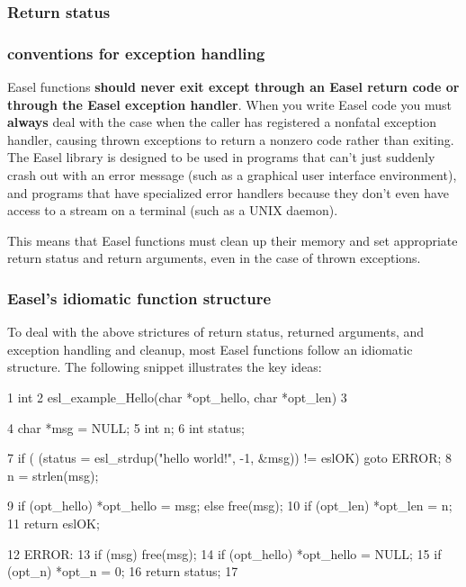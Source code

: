 \subsubsection{Return status}

\subsubsection{conventions for exception handling}

Easel functions {\bfseries should never exit except through an Easel
  return code or through the Easel exception handler}. When you write
Easel code you must {\bfseries always} deal with the case when the
caller has registered a nonfatal exception handler, causing thrown
exceptions to return a nonzero code rather than exiting. The Easel
library is designed to be used in programs that can't just suddenly
crash out with an error message (such as a graphical user interface
environment), and programs that have specialized error handlers
because they don't even have access to a  stream on a
terminal (such as a UNIX daemon).

This means that Easel functions must clean up their memory and set
appropriate return status and return arguments, even in the case of
thrown exceptions.


\subsubsection{Easel's idiomatic function structure}

To deal with the above strictures of return status, returned
arguments, and exception handling and cleanup, most Easel functions
follow an idiomatic structure.  The following snippet illustrates the
key ideas:

\begin{cchunk}
1    int
2    esl_example_Hello(char *opt_hello, char *opt_len)
3    {
4      char *msg = NULL;
5      int   n;
6      int   status;

7      if ( (status = esl_strdup("hello world!\n", -1, &msg)) != eslOK) goto ERROR;
8      n = strlen(msg);

9      if (opt_hello) *opt_hello = msg; else free(msg);
10     if (opt_len)   *opt_len   = n;
11     return eslOK;

12  ERROR:
13     if (msg)        free(msg);
14     if (opt_hello) *opt_hello = NULL;
15     if (opt_n)     *opt_n     = 0;
16     return status;
17  }
\end{cchunk}

